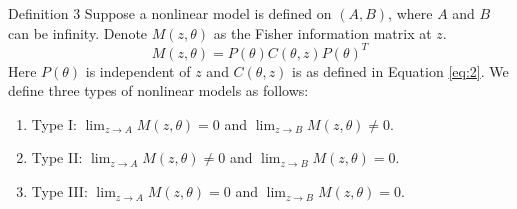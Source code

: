\documentclass[12pt]{TD-CJS}
\begin{document}
\begin{theorem}{Definition 3}{} Suppose a nonlinear model is defined on $(A,B)$, where $A$ and $B$ can be infinity. Denote $M(z,\theta)$ as the Fisher information matrix at $z$. \[
M(z,\theta)  = P(\theta)C(\theta,z)P(\theta)^T\] Here $P(\theta)$ is independent of $z$ and $C(\theta,z)$ is as defined in Equation \eqref{eq:2}. We define three types of nonlinear models as follows: \begin{enumerate}[(1)]
    \item Type I: $\lim_{z\to A}M(z,\theta)=0$ and $\lim_{z\to B}M(z,\theta)\ne 0$.
    \item Type II: $\lim_{z\to A}M(z,\theta)\ne 0$ and $\lim_{z\to B}M(z,\theta)=0$.
    \item Type III: $\lim_{z\to A}M(z,\theta)= 0$ and $\lim_{z\to B}M(z,\theta)=0$.
   \end{enumerate}
\end{theorem}
\end{document}
